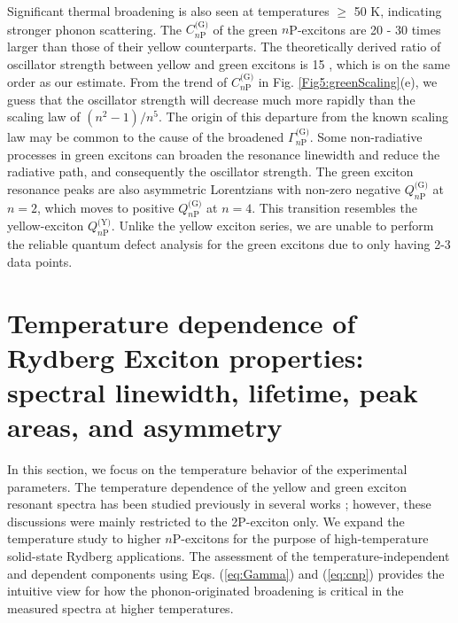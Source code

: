 \documentclass[aps,reprint,amsmath,amssymb,prb]{revtex4-1}
\begin{document}
Significant thermal broadening is also seen at temperatures $\geq$ 50 K, indicating stronger phonon scattering. 
The $C_{n\text{P}}^{\text{(G)}}$ of the green $n$P-excitons are 20 - 30 times larger than those of their yellow counterparts. The theoretically derived ratio of oscillator strength between yellow and green excitons is 15 \cite{Elliott1957,Itoh1975}, which is on the same order as our estimate.
From the trend of $C_{n\text{P}}^{\text{(G)}}$ in  Fig. \ref{Fig5:greenScaling}(e), we guess that the oscillator strength will decrease much more rapidly than the scaling law of $(n^{2}-1)/n^{5}$. The origin of this departure from the known scaling law may be common to the cause of the broadened $\Gamma_{n\text{P}}^{\text{(G)}}$. Some non-radiative processes in green excitons can broaden the resonance linewidth and reduce the radiative path, and consequently the oscillator strength.  
The green exciton resonance peaks are also asymmetric Lorentzians with non-zero negative $Q_{n\text{P}}^{\text{(G)}}$ at $n=2$, which moves to positive $Q_{n\text{P}}^{\text{(G)}}$ at $n=4$. This transition resembles the yellow-exciton $Q_{n\text{P}}^{\text{(Y)}}$. Unlike the yellow exciton series, we are unable to perform  the reliable quantum defect analysis for the green excitons due to only having 2-3 data points. 

\section{Temperature dependence of Rydberg Exciton properties: spectral linewidth, lifetime, peak areas, and asymmetry}

In this section, we focus on the temperature behavior of the experimental parameters.  The temperature dependence of the yellow and green exciton resonant spectra has been studied previously in several works \cite{Itoh1975,Iwamitsu2012}; however, these discussions were mainly restricted to the 2P-exciton only. We expand the temperature study to higher $n$P-excitons for the purpose of high-temperature solid-state Rydberg applications. The assessment of the temperature-independent and dependent components using Eqs. (\ref{eq:Gamma}) and (\ref{eq:cnp}) provides the intuitive view for how the phonon-originated broadening is critical in the measured spectra at higher temperatures.
\end{document}
